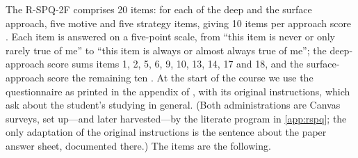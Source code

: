 The R-SPQ-2F comprises 20 items: for each of the deep and the surface
approach, five motive and five strategy items, giving 10 items per
approach score \autocite{RSPQ2F}.
Each item is answered on a five-point scale, from \enquote{this item is
never or only rarely true of me} to \enquote{this item is always or almost
always true of me}; the deep-approach score sums items 1, 2, 5, 6, 9, 10,
13, 14, 17 and 18, and the surface-approach score the remaining ten
\autocite[pp.~148--149]{RSPQ2F}.
At the start of the course we use the questionnaire as printed in the
appendix of \textcite{RSPQ2F}, with its original instructions, which ask
about the student's studying in general.
(Both administrations are Canvas surveys, set up---and later
harvested---by the literate program in \cref{app:rspq}; the only
adaptation of the original instructions is the sentence about the
paper answer sheet, documented there.)
The items are the following.
